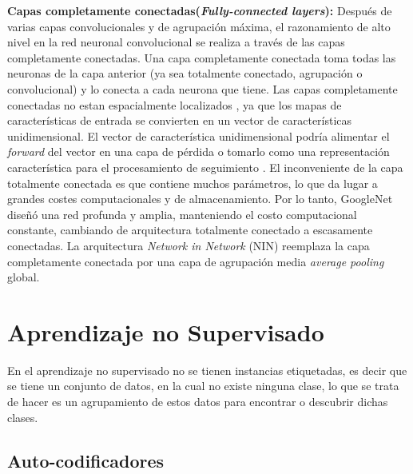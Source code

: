 \textbf{Capas completamente conectadas(\textit{Fully-connected layers}):}  Después de varias capas convolucionales y de agrupación máxima, el razonamiento de alto nivel en la red neuronal convolucional se realiza a través de las capas completamente conectadas. Una capa completamente conectada toma todas las neuronas de la capa anterior (ya sea totalmente conectado, agrupación o convolucional) y lo conecta a cada neurona que tiene. Las capas completamente conectadas no estan espacialmente localizados , ya que los mapas de características de entrada se convierten en un vector de características unidimensional. El vector de característica unidimensional podría alimentar el \textit{forward} del vector en una capa de pérdida o tomarlo como una representación característica para el procesamiento de seguimiento \cite{Girshick}. El inconveniente de la capa totalmente conectada es que contiene muchos parámetros, lo que da lugar a grandes costes computacionales y de almacenamiento. Por lo tanto, GoogleNet \cite{Szegedy} diseñó una red profunda y amplia, manteniendo el costo computacional constante, cambiando de arquitectura totalmente conectado a escasamente conectadas. La arquitectura \textit{Network in Network} (NIN) \cite{Lin} reemplaza la capa completamente conectada por una capa de agrupación media \textit{average pooling} global.



  
 
\section{Aprendizaje no Supervisado}\label{sec:nosupervisado}

En el aprendizaje no supervisado no se tienen instancias etiquetadas, es decir que se tiene un conjunto de datos, en la cual no existe ninguna clase, lo que se trata de hacer es un agrupamiento de estos datos para encontrar o descubrir dichas clases.

\subsection{Auto-codificadores}\label{sec:autoencoders}

